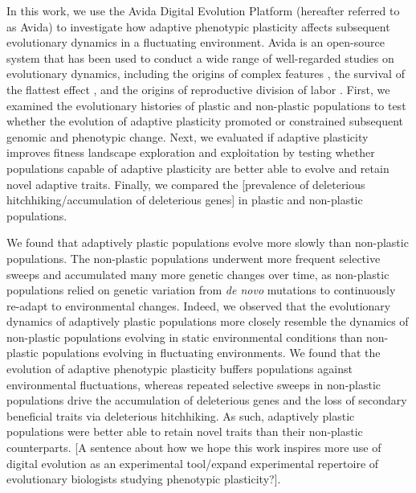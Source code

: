

In this work, we use the Avida Digital Evolution Platform (hereafter referred to as Avida) \citep{ofria_avida:_2009} to investigate how adaptive phenotypic plasticity affects subsequent evolutionary dynamics in a fluctuating environment.
Avida is an open-source system that has been used to conduct a wide range of well-regarded studies on evolutionary dynamics, including 
the origins of complex features \citep{lenski_evolutionary_2003},
the survival of the flattest effect \citep{wilke_evolution_2001},
and the origins of reproductive division of labor \citep{goldsby_evolutionary_2014}.
First, we examined the evolutionary histories of plastic and non-plastic populations to test whether the evolution of adaptive plasticity promoted or constrained subsequent genomic and phenotypic change.
Next, we evaluated if adaptive plasticity improves fitness landscape exploration and exploitation by testing whether populations capable of adaptive plasticity are better able to evolve and retain novel adaptive traits. 
Finally, we compared the [prevalence of deleterious hitchhiking/accumulation of deleterious genes] in plastic and non-plastic populations. 

We found that adaptively plastic populations evolve more slowly than non-plastic populations. 
The non-plastic populations underwent more frequent selective sweeps and accumulated many more genetic changes over time, as non-plastic populations relied on genetic variation from \textit{de novo} mutations to continuously re-adapt to environmental changes. 
Indeed, we observed that the evolutionary dynamics of adaptively plastic populations more closely resemble the dynamics of non-plastic populations evolving in static environmental conditions than non-plastic populations evolving in fluctuating environments.
We found that the evolution of adaptive phenotypic plasticity buffers populations against environmental fluctuations, whereas repeated selective sweeps in non-plastic populations drive the accumulation of deleterious genes and the loss of secondary beneficial traits via deleterious hitchhiking.
As such, adaptively plastic populations were better able to retain novel traits than their non-plastic counterparts.
[A sentence about how we hope this work inspires more use of digital evolution as an experimental tool/expand experimental repertoire of evolutionary biologists studying phenotypic plasticity?].